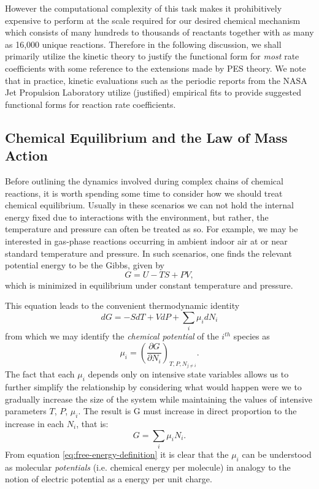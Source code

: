 However the computational complexity of this task makes it prohibitively expensive to perform at the scale required for our desired chemical mechanism which consists of many hundreds to thousands of reactants together with as many as 16,000 unique reactions. Therefore in the following discussion, we shall primarily utilize the kinetic theory to justify the functional form for \textit{most} rate coefficients with some reference to the extensions made by PES theory. We note that in practice, kinetic evaluations such as the periodic reports from the NASA Jet Propulsion Laboratory \cite{jpl-kinetic-evaluation-2020} utilize (justified) empirical fits to provide suggested functional forms for reaction rate coefficients.

\subsection{Chemical Equilibrium and the Law of Mass Action}

Before outlining the dynamics involved during complex chains of chemical reactions, it is worth spending some time to consider how we should treat chemical equilibrium. Usually in these scenarios we can not hold the internal energy fixed due to interactions with the environment, but rather, the temperature and pressure can often be treated as so. For example, we may be interested in gas-phase reactions occurring in ambient indoor air at or near standard temperature and pressure. In such scenarios, one finds the relevant potential energy to be the Gibbs, given by
\begin{equation}
  G = U - TS + PV,
\end{equation}
which is minimized in equilibrium under constant temperature and pressure.

This equation leads to the convenient thermodynamic identity
\begin{equation}
  dG = -SdT + VdP + \sum_i \mu_i dN_i
\end{equation}
from which we may identify the \textit{chemical potential} of the $i^{th}$ species as
\begin{equation}
  \mu_i  = \left(\frac{\partial G}{\partial N_i} \right)_{T,P,N_{j\neq i}}.
\end{equation}
The fact that each $\mu_i$ depends only on intensive state variables allows us to further simplify the relationship by considering what would happen were we to gradually increase the size of the system while maintaining the values of intensive parameters $T$, $P$, $\mu_i$. The result is G must increase in direct proportion to the increase in each $N_i$, that is:
\begin{equation}
  \label{eq:free-energy-definition}
  G = \sum_i \mu_i N_i.
\end{equation}
From equation \ref{eq:free-energy-definition} it is clear that the $\mu_i$ can be understood as molecular \textit{potentials} (i.e. chemical energy per molecule) in analogy to the notion of electric potential as a energy per unit charge.


